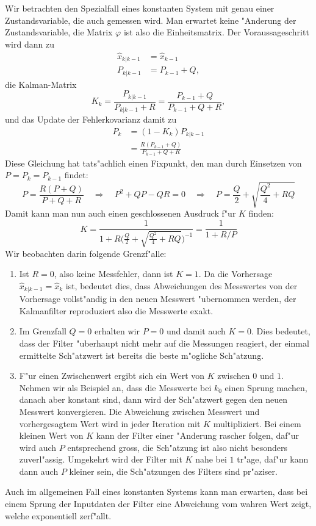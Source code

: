 Wir betrachten den Spezialfall eines konstanten System mit genau einer
Zustandsvariable,
die auch gemessen wird.
Man erwartet keine "Anderung der Zustandsvariable,
die Matrix $\varphi$ ist also die Einheitsmatrix.
Der Voraussageschritt wird
dann zu 
\begin{align*}
\hat x_{k|k-1}&=\hat x_{k-1}\\
P_{k|k-1}&=P_{k-1}+Q,
\end{align*}
die Kalman-Matrix 
\[
K_{k}=\frac{P_{k|k-1}}{P_{k|k-1}+R}=\frac{P_{k-1}+Q}{P_{k-1}+Q+R},
\]
und das Update der Fehlerkovarianz damit zu
\begin{align*}
P_k&=(1-K_k)P_{k|k-1}\\
&=\frac{R(P_{k-1}+Q)}{P_{k-1}+Q+R}
\end{align*}
Diese Gleichung hat tats"achlich einen Fixpunkt, den man durch
Einsetzen von $P=P_k=P_{k-1}$ findet:
\[
P=\frac{R(P+Q)}{P+Q+R}
\quad\Rightarrow\quad
P^2+QP-QR=0
\quad\Rightarrow\quad
P=\frac{Q}2+\sqrt{\frac{Q^2}4+RQ}
\]
Damit kann man nun auch einen geschlossenen Ausdruck f"ur $K$
finden:
\[
K=\frac{1}{1+R\biggl(\displaystyle\frac{Q}2+\sqrt{\frac{Q^2}4+RQ}\biggr)^{-1}}
=\frac1{1+R/P}
\]
Wir beobachten darin folgende Grenzf"alle:
\begin{enumerate}
\item Ist $R=0$, also keine Messfehler, dann ist $K=1$.
Da die Vorhersage
$\hat x_{k|k-1}=\hat x_k$ ist, bedeutet dies, dass Abweichungen des Messwertes
von der Vorhersage vollst"andig in den neuen Messwert "ubernommen werden,
der Kalmanfilter reproduziert also die Messwerte exakt.
\item Im Grenzfall $Q=0$ erhalten wir $P=0$ und damit auch $K=0$.
Dies
bedeutet, dass der Filter "uberhaupt nicht mehr auf die Messungen reagiert,
der einmal ermittelte Sch"atzwert ist bereits die beste m"ogliche Sch"atzung.
\item F"ur einen Zwischenwert ergibt sich ein Wert von $K$ zwischen $0$ und $1$.
Nehmen wir als Beispiel an, dass die Messwerte bei $k_0$ einen Sprung machen,
danach aber konstant sind, dann wird der Sch"atzwert gegen den neuen Messwert
konvergieren.
Die Abweichung zwischen Messwert und vorhergesagtem Wert wird
in jeder Iteration mit $K$ multipliziert.
Bei einem kleinen Wert von $K$
kann der Filter einer "Anderung rascher folgen, daf"ur wird auch $P$ entsprechend
gross, die Sch"atzung ist also nicht besonders zuverl"assig.
Umgekehrt wird der Filter mit $K$ nahe bei $1$ tr"age, daf"ur kann dann auch
$P$ kleiner sein, die Sch"atzungen des Filters sind pr"aziser.
\end{enumerate}
Auch im allgemeinen Fall eines konstanten Systems kann man erwarten,
dass bei einem Sprung der Inputdaten der Filter eine Abweichung vom
wahren Wert zeigt, welche exponentiell zerf"allt.

